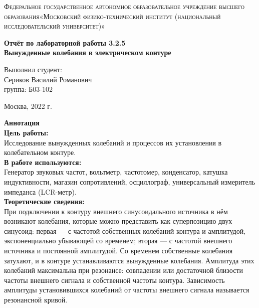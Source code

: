 \documentclass[a4paper, 12pt]{article}%
\begin{document}
	\begin{titlepage}
		\begin{center}
			\textsc{Федеральное государственное автономное образовательное учреждение высшего образования«Московский физико-технический институт (национальный исследовательский университет)»\\[5mm]
			}
			
			\vfill
			
			\textbf{Отчёт по лабораторной работы 3.2.5\\[3mm]
				Вынужденные колебания в электрическом контуре
				\\[50mm]
			}
			
		\end{center}
		
		\hfill
		\begin{minipage}{.5\textwidth}
			Выполнил студент:\\[2mm]
			Сериков Василий Романович\\[2mm]
			группа: Б03-102\\[5mm]
			
		\end{minipage}
		\vfill
		\begin{center}
			Москва, 2022 г.
		\end{center}
		
	\end{titlepage}
	
	\newpage
	\textbf{Аннотация}\\
	
	
	\textbf{Цель работы: }\\
	
	Исследование вынужденных колебаний и процессов их установления в колебательном контуре.\\
	
	\textbf{В работе используются: }\\
	
	Генератор звуковых частот, вольтметр, частотомер, конденсатор, катушка индуктивности, магазин сопротивлений, осциллограф, универсальный измеритель импеданса (LCR-метр).\\
	
	\textbf{Теоретические сведения: } \\
	
	При подключении к контуру внешнего синусоидального источника в
	нём возникают колебания, которые можно представить как суперпозицию двух синусоид: первая — с частотой собственных колебаний
	контура и амплитудой, экспоненциально убывающей со временем; вторая — с частотой внешнего источника и постоянной амплитудой. Со временем собственные колебания затухают, и в контуре устанавливаются
	вынужденные колебания. Амплитуда этих колебаний максимальна при
	резонансе: совпадении или достаточной близости частоты внешнего сигнала и собственной частоты контура. Зависимость амплитуды установившихся колебаний от частоты внешнего сигнала называется резонансной
	кривой.
	
\end{document}
